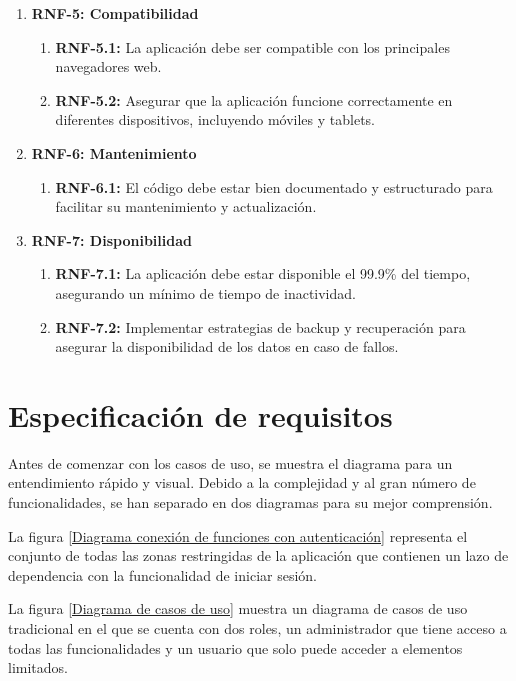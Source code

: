 \begin{enumerate}
    \item \textbf{RNF-5: Compatibilidad}
    \begin{enumerate}
        \item \textbf{RNF-5.1:} La aplicación debe ser compatible con los principales navegadores web.
        \item \textbf{RNF-5.2:} Asegurar que la aplicación funcione correctamente en diferentes dispositivos, incluyendo móviles y tablets.
    \end{enumerate}

    \item \textbf{RNF-6: Mantenimiento}
    \begin{enumerate}
        \item \textbf{RNF-6.1:} El código debe estar bien documentado y estructurado para facilitar su mantenimiento y actualización.
    \end{enumerate}

    \item \textbf{RNF-7: Disponibilidad}
    \begin{enumerate}
        \item \textbf{RNF-7.1:} La aplicación debe estar disponible el 99.9\% del tiempo, asegurando un mínimo de tiempo de inactividad.
        \item \textbf{RNF-7.2:} Implementar estrategias de backup y recuperación para asegurar la disponibilidad de los datos en caso de fallos.
    \end{enumerate}
\end{enumerate}

\section{Especificación de requisitos}
Antes de comenzar con los casos de uso, se muestra el diagrama para un entendimiento rápido y visual. Debido a la complejidad y al gran número de funcionalidades, se han separado en dos diagramas para su mejor comprensión. 

La figura \ref{Diagrama conexión de funciones con autenticación} representa el conjunto de todas las zonas restringidas de la aplicación que contienen un lazo de dependencia con la funcionalidad de iniciar sesión.

La figura \ref{Diagrama de casos de uso} muestra un diagrama de casos de uso tradicional en el que se cuenta con dos roles, un administrador que tiene acceso a todas las funcionalidades y un usuario que solo puede acceder a elementos limitados.

